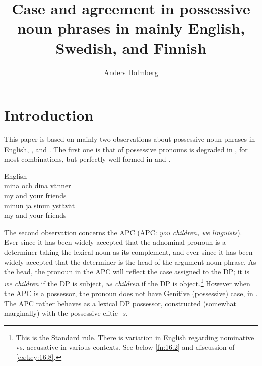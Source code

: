 \documentclass[output=paper]{langsci/langscibook}
\author{Anders Holmberg\affiliation{University of Newcastle}}
\title{Case and agreement in possessive noun phrases in mainly English, Swedish,
and Finnish}
\begin{document}
\glsresetall
\maketitle


\section{Introduction}\label{sec:key:16.1}

This paper is based on mainly two observations about possessive noun phrases in
English, , and . The first one is that  of possessive
pronouns is degraded in , for most combinations, but perfectly well
formed in  and .\newpage

\ea\label{ex:key:16.1}
	\ea English\\
	\ex {}
    \sn
		\gll mina och dina vänner\\
        my    and your friends\\
    \ex {}
    \sn
		\gll minun ja  sinun ystävät\\
        my and your friends\\
	\z
\z

The second observation concerns the \glsdesc{APC}
(\gls{APC}:
\emph{you children, we linguists}). Ever since \textcite{Postal1969} it has been widely
accepted that the adnominal pronoun is a determiner taking the lexical noun as
its complement, and ever since \citet{Abney1987} it has been widely accepted
that the determiner is the head of the argument noun phrase.  As the head, the
pronoun in the \gls{APC} will reflect the case assigned to the DP; it is
\emph{we children} if the DP is subject, \emph{us children} if the DP is
object.\footnote{ This is the Standard  rule. There is variation in
English regarding nominative vs. accusative in various
contexts. See below \cref{fn:16.2} and discussion of \eqref{ex:key:16.8}.} However when the
\gls{APC} is a possessor, the pronoun does not have Genitive (possessive) case,
in . The \gls{APC} rather behaves as a lexical DP possessor, constructed
(somewhat marginally) with the possessive clitic \emph{-s}.
\end{document}
